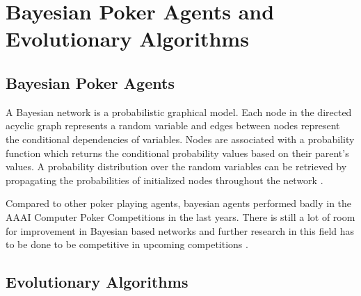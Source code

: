\section{Bayesian Poker Agents and Evolutionary Algorithms}
\subsection{Bayesian Poker Agents}
A Bayesian network is a probabilistic graphical model. Each node in the directed acyclic graph represents a random variable and edges between nodes represent the conditional dependencies of variables. Nodes are associated with a probability function which returns the conditional probability values based on their parent's values. A probability distribution over the random variables can be retrieved by propagating the probabilities of initialized nodes throughout the network \cite{review}. \par
Compared to other poker playing agents, bayesian agents performed badly in the AAAI Computer Poker Competitions in the last years. There is still a lot of room for improvement in Bayesian based networks and further research in this field has to be done to be competitive in upcoming competitions \cite{review}. 
\subsection{Evolutionary Algorithms}

